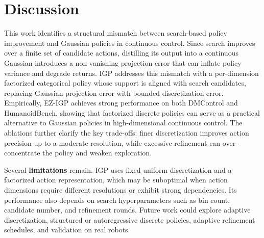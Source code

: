 \section{Discussion}
\label{sec:discussion}

This work identifies a structural mismatch between search-based policy improvement and Gaussian policies in continuous control. Since search improves over a finite set of candidate actions, distilling its output into a continuous Gaussian introduces a non-vanishing projection error that can inflate policy variance and degrade returns. IGP addresses this mismatch with a per-dimension factorized categorical policy whose support is aligned with search candidates, replacing Gaussian projection error with bounded discretization error.
Empirically, EZ-IGP achieves strong performance on both DMControl and HumanoidBench, showing that factorized discrete policies can serve as a practical alternative to Gaussian policies in high-dimensional continuous control. The ablations further clarify the key trade-offs: finer discretization improves action precision up to a moderate resolution, while excessive refinement can over-concentrate the policy and weaken exploration.

Several \textbf{limitations} remain. IGP uses fixed uniform discretization and a factorized action representation, which may be suboptimal when action dimensions require different resolutions or exhibit strong dependencies. Its performance also depends on search hyperparameters such as bin count, candidate number, and refinement rounds. Future work could explore adaptive discretization, structured or autoregressive discrete policies, adaptive refinement schedules, and validation on real robots.